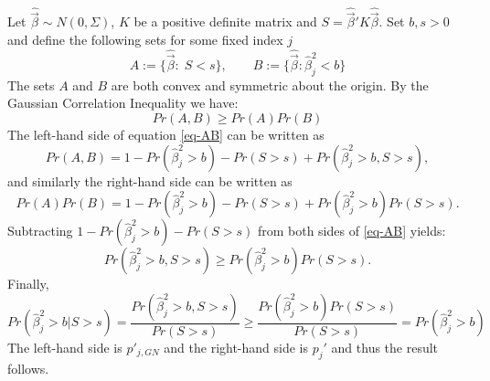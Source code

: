 \documentclass{article}
\begin{document}
Let $\hat{\vec\beta} \sim N(0, \Sigma)$, $K$ be a positive definite matrix and $S = \hat{\vec\beta}'K\hat{\vec\beta}$. Set $b, s > 0$ and define the following sets for some fixed index $j$
$$
A := \{\hat{\vec\beta}: \; S < s\}, \qquad
B := \{\hat{\vec\beta}: \hat\beta_j^{2} < b \}
$$
The sets $A$ and $B$ are both convex and symmetric about the origin. By the Gaussian Correlation Inequality we have:
\begin{equation}\label{eq-AB}
Pr(A,B) \geq Pr(A)Pr(B)
\end{equation}
The left-hand side of equation \eqref{eq-AB} can be written as
$$
Pr(A,B) = 1 - Pr(\hat\beta_j^{2} > b) - Pr(S > s) + Pr(\hat\beta_j^{2} > b, S > s),
$$
and similarly the right-hand side can be written as
$$
Pr(A)Pr(B) = 1 - Pr(\hat\beta_j^{2} > b) - Pr(S > s) + Pr(\hat\beta_j^{2} > b) Pr(S > s).
$$
Subtracting $1 - Pr(\hat\beta_j^{2} > b) - Pr(S > s)$ from both sides of \eqref{eq-AB} yields:
$$
Pr(\hat\beta_j^{2} > b, S > s) \geq Pr(\hat\beta_j^{2} > b) Pr(S > s).
$$
Finally, 
$$
Pr(\hat\beta_j^{2} > b | S > s) = \frac{Pr(\hat\beta_j^{2} > b,S > s)}{Pr(S > s)} 
\geq  \frac{Pr(\hat\beta_j^{2} > b) Pr(S > s)}{Pr(S > s)} 
= Pr(\hat\beta_j^{2} > b)
$$
The left-hand side is $p'_{j,GN}$ and the right-hand side is $p_j'$ and thus the result follows. 
\end{document}
